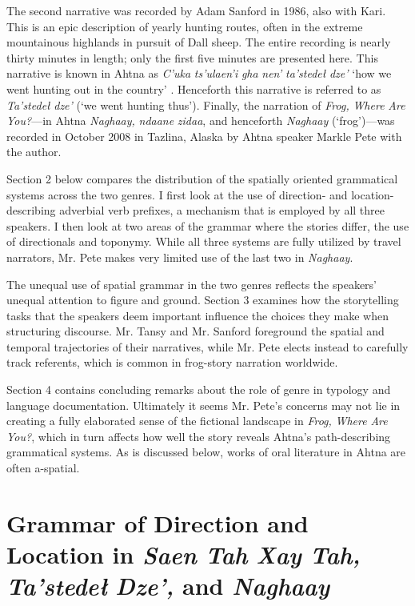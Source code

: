 The second narrative was recorded by Adam Sanford in 1986, also with Kari. This is an epic description of yearly hunting routes, often in the extreme mountainous highlands in pursuit of Dall sheep. The entire recording is nearly thirty minutes in length; only the first five minutes are presented here. This narrative is known in Ahtna as \textit{C’uka} \textit{ts’ulaen’i} \textit{gha} \textit{nen’} \textit{ta’stedeł} \textit{dze’} ‘how we went hunting out in the country’ \citep[91-128]{Kari2010}. Henceforth this narrative is referred to as \textit{Ta’stedeł} \textit{dze’} (‘we went hunting thus’). Finally, the narration of \textit{Frog,} \textit{Where} \textit{Are} \textit{You?}---in Ahtna \textit{Naghaay,} \textit{ndaane} \textit{zidaa}, and henceforth \textit{Naghaay} (‘frog’)---was recorded in October 2008 in Tazlina, Alaska by Ahtna speaker Markle Pete with the author.

Section 2 below compares the distribution of the spatially oriented grammatical systems across the two genres. I first look at the use of direction- and location-describing adverbial verb prefixes, a mechanism that is employed by all three speakers. I then look at two areas of the grammar where the stories differ, the use of directionals and toponymy. While all three systems are fully utilized by travel narrators, Mr. Pete makes very limited use of the last two in \textit{Naghaay}.

The unequal use of spatial grammar in the two genres reflects the speakers’ unequal attention to figure and ground. Section 3 examines how the storytelling tasks that the speakers deem important influence the choices they make when structuring discourse. Mr. Tansy and Mr. Sanford foreground the spatial and temporal trajectories of their narratives, while Mr. Pete elects instead to carefully track referents, which is common in frog-story narration worldwide.

Section 4 contains concluding remarks about the role of genre in typology and language documentation. Ultimately it seems Mr. Pete’s concerns may not lie in creating a fully elaborated sense of the fictional landscape in \textit{Frog,} \textit{Where} \textit{Are} \textit{You?}, which in turn affects how well the story reveals Ahtna’s path-describing grammatical systems. As is discussed below, works of oral literature in Ahtna are often a-spatial.

\section{Grammar of Direction and Location in \textit{Saen} \textit{Tah} \textit{Xay} \textit{Tah,} \textit{Ta’stedeł} \textit{Dze’,} and \textit{Naghaay}}

